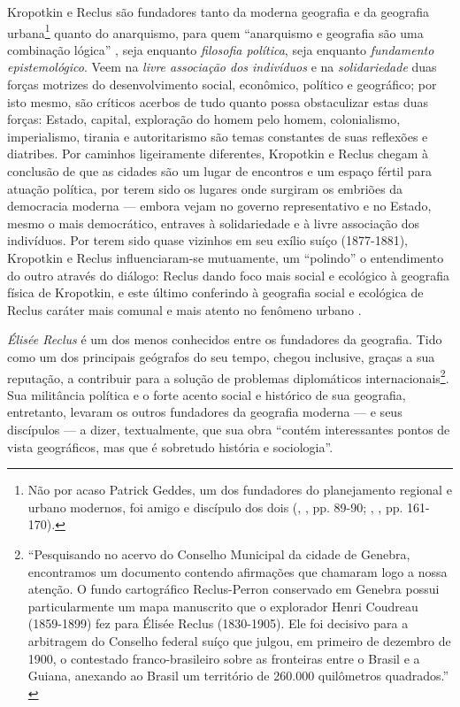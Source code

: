 Kropotkin e Reclus são fundadores tanto da moderna geografia e da geografia urbana\footnote{Não por acaso Patrick Geddes, um dos fundadores do planejamento regional e urbano modernos, foi amigo e discípulo dos dois (\citeauthor{dunbar_elisee_1989}, \citeyear{dunbar_elisee_1989}, pp. 89-90; \citeauthor{hall_cidades_2007}, \citeyear{hall_cidades_2007}, pp. 161-170).} quanto do anarquismo, para quem ``anarquismo e geografia são uma combinação lógica'' \cite[p.~78]{dunbar_elisee_1989}, seja enquanto \textit{filosofia política}, seja enquanto \textit{fundamento epistemológico}. Veem na \textit{livre associação dos indivíduos} e na \textit{solidariedade} duas forças motrizes do desenvolvimento social, econômico, político e geográfico; por isto mesmo, são críticos acerbos de tudo quanto possa obstaculizar estas duas forças: Estado, capital, exploração do homem pelo homem, colonialismo, imperialismo, tirania e autoritarismo são temas constantes de suas reflexões e diatribes. Por caminhos ligeiramente diferentes, Kropotkin e Reclus chegam à conclusão de que as cidades são um lugar de encontros e um espaço fértil para atuação política, por terem sido os lugares onde surgiram os embriões da democracia moderna --- embora vejam no governo representativo e no Estado, mesmo o mais democrático, entraves à solidariedade e à livre associação dos indivíduos. Por terem sido quase vizinhos em seu exílio suíço (1877-1881), Kropotkin e Reclus influenciaram-se mutuamente, um ``polindo'' o entendimento do outro através do diálogo: Reclus dando foco mais social e ecológico à geografia física de Kropotkin, e este último conferindo à geografia social e ecológica de Reclus caráter mais comunal e mais atento no fenômeno urbano \cite[p.~209-210]{WARD2010}.

\textit{Élisée Reclus} é um dos menos conhecidos entre os fundadores da geografia. Tido como um dos principais geógrafos do seu tempo, chegou inclusive, graças a sua reputação, a contribuir para a solução de problemas diplomáticos internacionais\footnote{``Pesquisando no acervo do Conselho Municipal da cidade de Genebra, encontramos um documento contendo afirmações que chamaram logo a nossa atenção. O fundo cartográfico Reclus-Perron conservado em Genebra possui particularmente um mapa manuscrito que o explorador Henri Coudreau (1859-1899) fez para Élisée Reclus (1830-1905). Ele foi decisivo para a arbitragem do Conselho federal suíço que julgou, em primeiro de dezembro de 1900, o contestado franco-brasileiro sobre as fronteiras entre o Brasil e a Guiana, anexando ao Brasil um território de 260.000 quilômetros quadrados.'' \cite[p.~2]{FERRETTI2013}}. Sua militância política e o forte acento social e histórico de sua geografia, entretanto, levaram os outros fundadores da geografia moderna --- e seus discípulos --- a dizer, textualmente, que sua obra ``contém interessantes pontos de vista geográficos, mas que é sobretudo história e sociologia''.


